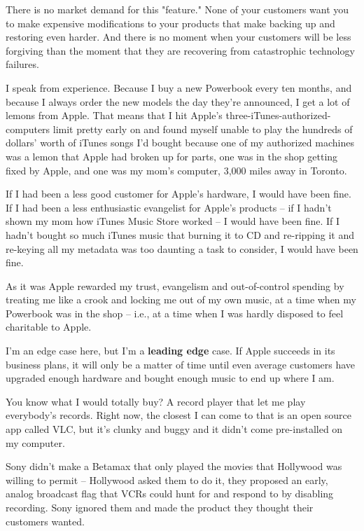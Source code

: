 There is no market demand for this "feature." None of your
customers want you to make expensive modifications to your products
that make backing up and restoring even harder. And there is no
moment when your customers will be less forgiving than the moment
that they are recovering from catastrophic technology failures.

I speak from experience. Because I buy a new Powerbook every ten
months, and because I always order the new models the day they're
announced, I get a lot of lemons from Apple. That means that I hit
Apple's three-iTunes-authorized-computers limit pretty early on and
found myself unable to play the hundreds of dollars' worth of
iTunes songs I'd bought because one of my authorized machines was a
lemon that Apple had broken up for parts, one was in the shop
getting fixed by Apple, and one was my mom's computer, 3,000 miles
away in Toronto.

If I had been a less good customer for Apple's hardware, I would
have been fine. If I had been a less enthusiastic evangelist for
Apple's products -- if I hadn't shown my mom how iTunes Music Store
worked -- I would have been fine. If I hadn't bought so much iTunes
music that burning it to CD and re-ripping it and re-keying all my
metadata was too daunting a task to consider, I would have been
fine.

As it was Apple rewarded my trust, evangelism and out-of-control
spending by treating me like a crook and locking me out of my own
music, at a time when my Powerbook was in the shop -- i.e., at a
time when I was hardly disposed to feel charitable to Apple.

I'm an edge case here, but I'm a \textbf{leading edge} case. If
Apple succeeds in its business plans, it will only be a matter of
time until even average customers have upgraded enough hardware and
bought enough music to end up where I am.

You know what I would totally buy? A record player that let me play
everybody's records. Right now, the closest I can come to that is
an open source app called VLC, but it's clunky and buggy and it
didn't come pre-installed on my computer.

Sony didn't make a Betamax that only played the movies that
Hollywood was willing to permit -- Hollywood asked them to do it,
they proposed an early, analog broadcast flag that VCRs could hunt
for and respond to by disabling recording. Sony ignored them and
made the product they thought their customers wanted.

